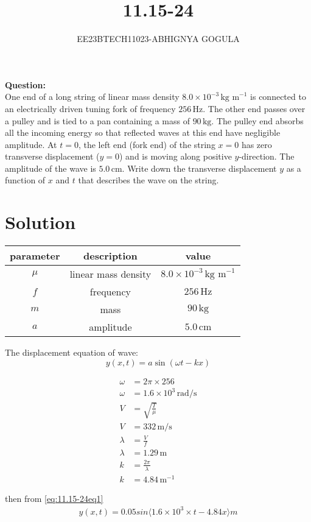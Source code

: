 \documentclass[journal,12pt,twocolumn]{IEEEtran}
\newcommand{\brak}[1]{\langle #1 \rangle}
\theoremstyle{remark}
\begin{document}

\vspace{3cm}
\title{\textbf{11.15-24}}
\author{EE23BTECH11023-ABHIGNYA GOGULA}
\maketitle
\newpage
\bigskip
\renewcommand{\thefigure}{\theenumi}
\renewcommand{\thetable}{\theenumi}
\textbf{Question:}
\\
 One end of a long string of linear mass density $8.0 \times 10^{-3} \, \text{kg m}^{-1}$ is connected to an electrically driven tuning fork of frequency $256 \, \text{Hz}$. The other end passes over a pulley and is tied to a pan containing a mass of $90 \, \text{kg}$. The pulley end absorbs all the incoming energy so that reflected waves at this end have negligible amplitude. At $t=0$, the left end (fork end) of the string $x=0$ has zero transverse displacement ($y=0$) and is moving along positive $y$-direction. The amplitude of the wave is $5.0 \, \text{cm}$. Write down the transverse displacement $y$ as a function of $x$ and $t$ that describes the wave on the string.
\section*{Solution}
\begin{tabular}{|c|c|c|}
\hline
parameter & description & value \\
\hline 
$\mu$ & linear mass density & $8.0 \times 10^{-3} \, \text{kg m}^{-1}$ \\
\hline
$f$ & frequency & $256 \, \text{Hz}$ \\
\hline
$m$ & mass & $90 \, \text{kg}$ \\
\hline
$a$ & amplitude & $5.0 \, \text{cm}$ \\
\hline
\end{tabular}
The displacement equation of wave: \\
\begin{equation}
    y(x,t) = a \sin(\omega t - kx)
    \label{eq:11.15-24eq1}
\end{equation}

\begin{align}
    \omega &= 2 \pi \times 256 \\
    \omega &= 1.6 \times 10^{3} \, \text{rad/s} \\
    V &= \sqrt{\frac{T}{\mu}} \\
    V &= 332 \, \text{m/s} \\
    \lambda &= \frac{V}{f} \\
    \lambda &= 1.29 \, \text{m} \\
    k &= \frac{2 \pi}{\lambda} \\
    k &= 4.84 \, \text{m}^{-1}
\end{align}

then from \eqref{eq:11.15-24eq1}
\begin{align}
y(x,t)=0.05sin\brak{1.6 \times 10^3 \times t-4.84x}m
\end{align}
\end{document}
